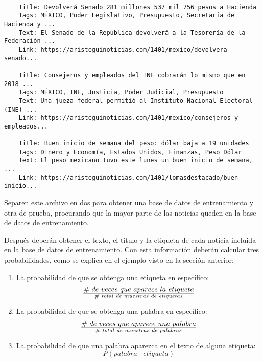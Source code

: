 \begin{verbatim}

    Title: Devolverá Senado 281 millones 537 mil 756 pesos a Hacienda
    Tags: MÉXICO, Poder Legislativo, Presupuesto, Secretaría de Hacienda y ...
    Text: El Senado de la República devolverá a la Tesorería de la Federación ...
    Link: https://aristeguinoticias.com/1401/mexico/devolvera-senado...

    Title: Consejeros y empleados del INE cobrarán lo mismo que en 2018 ...
    Tags: MÉXICO, INE, Justicia, Poder Judicial, Presupuesto
    Text: Una jueza federal permitió al Instituto Nacional Electoral (INE) ...
    Link: https://aristeguinoticias.com/1401/mexico/consejeros-y-empleados...

    Title: Buen inicio de semana del peso: dólar baja a 19 unidades
    Tags: Dinero y Economía, Estados Unidos, Finanzas, Peso Dólar
    Text: El peso mexicano tuvo este lunes un buen inicio de semana, ...
    Link: https://aristeguinoticias.com/1401/lomasdestacado/buen-inicio...

\end{verbatim}

Separen este archivo en dos para obtener una base de datos de entrenamiento y otra de prueba, procurando que la mayor parte de las noticias queden en la base de datos de entrenamiento.

Después deberán obtener el texto, el título y la etiqueta de cada noticia incluida en la base de datos de entrenamiento. Con esta información deberán calcular tres probabilidades, como se explica en el ejemplo visto en la sección anterior:

\begin{enumerate}
  \item La probabilidad de que se obtenga una etiqueta en específico:
  \begin{equation*}
   \#\ de\ veces\ que\ aparece\ la\ etiqueta \over \#\ total\ de\ muestras\ de\ etiquetas
  \end{equation*}
  
  \item La probabilidad de que se obtenga una palabra en específico:
  \begin{equation*}
   \#\ de\ veces\ que\ aparece\ una\ palabra \over \#\ total\ de\ muestras\ de\ palabras
  \end{equation*}
  
  \item La probabilidad de que una palabra aparezca en el texto de alguna etiqueta:
  \begin{equation*}
   P(palabra \mid etiqueta)
  \end{equation*}
\end{enumerate}

